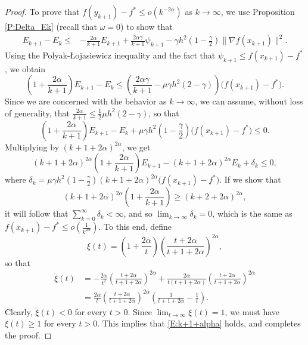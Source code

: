 \documentclass[onefignum,onetabnum]{siamart220329}
\begin{document}
\begin{proof}
To prove that $f(y_{k+1}) - f^* \le o\left( k^{-2\alpha} \right)$ as $k\to\infty$, we use Proposition \ref{P:Delta_Ek} (recall that $\omega=0$) to show that
\begin{align*}
E_{k+1} - E_k \le &
    -\frac{2\alpha}{k+1}E_{k+1} +\frac{2\alpha\gamma}{k+1}\psi_{k+1} -\gamma h^2 \left(1-\frac{\gamma}{2}\right)\| \nabla f(x_{k+1}) \|^2.
\end{align*}
Using the Polyak-\L ojasiewicz inequality and the fact that $\psi_{k+1}\le f(x_{k+1})-f^*$, we obtain
$$\left(1+\frac{2\alpha}{k+1}\right)E_{k+1} - E_k \le
    \left(\frac{2\alpha\gamma}{k+1}-\mu\gamma h^2 (2-\gamma)\right)\big(f(x_{k+1})-f^*\big).$$
Since we are concerned with the behavior as $k\to\infty$, we can assume, without loss of generality, that $\frac{2\alpha}{k+1}\le \frac{1}{2}\mu h^2(2-\gamma)$, so that
$$\left(1+\frac{2\alpha}{k+1}\right)E_{k+1} - E_k 
+ \mu\gamma h^2\left(1-\frac{\gamma}{2}\right)\big(f(x_{k+1})-f^*\big)\le 0.$$
Multiplying by $(k+1+2\alpha)^{2\alpha}$, we get
$$(k+1+2\alpha)^{2\alpha}\left(1+\frac{2\alpha}{k+1}\right) E_{k+1} - (k+1+2\alpha)^{2\alpha}E_k +\delta_k \le 0,$$
where $\delta_k=\mu\gamma h^2\left(1-\frac{\gamma}{2}\right)(k+1+2\alpha)^{2\alpha}\big(f(x_{k+1})-f^*\big)$. If we show that
\begin{equation} \label{E:k+1+alpha}
(k+1+2\alpha)^{2\alpha}\left(1+\frac{2\alpha}{k+1}\right) \ge (k+2+2\alpha)^{2\alpha},
\end{equation}
it will follow that $\sum_{k=0}^\infty\delta_k<\infty$, and so $\lim_{k\to\infty}\delta_k=0$, which is the same as $f(x_{k+1})-f^*\le o(\frac{1}{k^{2\alpha}})$. To this end, define 
$$\xi(t)=\left(1+\frac{2\alpha}{t}\right)\left(\frac{t+2\alpha}{t+1+2\alpha}\right)^{2\alpha},$$
so that
\begin{align*}
\dot{\xi}(t) &= -\frac{2\alpha}{t^2}\left(\frac{t+2\alpha}{t+1+2\alpha}\right)^{2\alpha}
+\frac{2\alpha}{t(t+1+2\alpha)}\left(\frac{t+2\alpha}{t+1+2\alpha}\right)^{2\alpha} \\
& = \frac{2\alpha}{t}\left(\frac{t+2\alpha}{t+1+2\alpha}\right)^{2\alpha}\left(\frac{1}{t+1+2\alpha}-\frac{1}{t}\right).    
\end{align*}
Clearly, $\dot{\xi}(t)<0$ for every $t>0$. Since $\lim_{t\to\infty}\xi(t)=1$, we must have $\xi(t)\ge 1$ for every $t>0$. This implies that \eqref{E:k+1+alpha} holds, and completes the proof.
\end{proof} 
\end{document}
